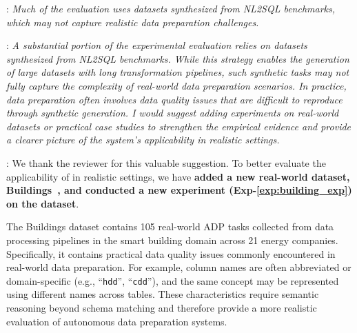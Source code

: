 \begin{shaded}
{
: 
\emph{Much of the evaluation uses datasets synthesized from NL2SQL benchmarks, which may not capture realistic data preparation challenges.
}

: 
\emph{A substantial portion of the experimental evaluation relies on datasets synthesized from NL2SQL benchmarks. While this strategy enables the generation of large datasets with long transformation pipelines, such synthetic tasks may not fully capture the complexity of real-world data preparation scenarios. In practice, data preparation often involves data quality issues that are difficult to reproduce through synthetic generation. I would suggest adding experiments on real-world datasets or practical case studies to strengthen the empirical evidence and provide a clearer picture of the system's applicability in realistic settings.
}
%
}
\end{shaded}

:
We thank the reviewer for this valuable suggestion. To better evaluate the applicability of \sys in realistic settings, we have \textbf{added a new real-world dataset, Buildings~\cite{sharma2023automatic}, and conducted a new experiment (Exp-\ref{exp:building_exp}) on the dataset}.


The Buildings dataset contains 105 real-world ADP tasks collected from data processing pipelines in the smart building domain across 21 energy companies. Specifically, it contains practical data quality issues commonly encountered in real-world data preparation. For example, column names are often abbreviated or domain-specific (e.g., ``\texttt{hdd}'', ``\texttt{cdd}''), and the same concept may be represented using different names across tables. These characteristics require semantic reasoning beyond schema matching and therefore provide a more realistic evaluation of autonomous data preparation systems.


